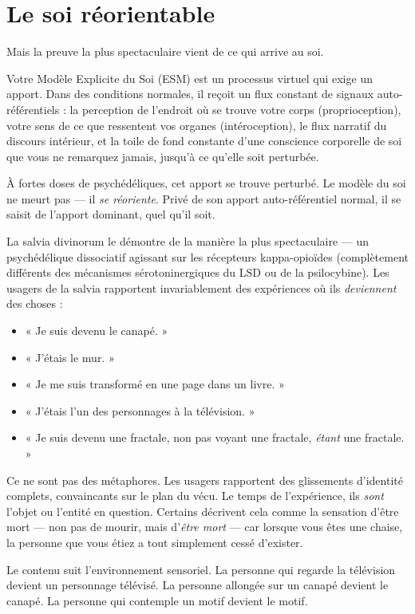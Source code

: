 \documentclass[11pt, twoside, openright]{book}
\begin{document}
\section*{Le soi réorientable}

Mais la preuve la plus spectaculaire vient de ce qui arrive au soi.

Votre Modèle Explicite du Soi (ESM) est un processus virtuel qui exige un apport. Dans des conditions normales, il reçoit un flux constant de signaux auto-référentiels : la perception de l'endroit où se trouve votre corps (proprioception), votre sens de ce que ressentent vos organes (intéroception), le flux narratif du discours intérieur, et la toile de fond constante d'une conscience corporelle de soi que vous ne remarquez jamais, jusqu'à ce qu'elle soit perturbée.

À fortes doses de psychédéliques, cet apport se trouve perturbé. Le modèle du soi ne meurt pas --- il \textit{se réoriente}. Privé de son apport auto-référentiel normal, il se saisit de l'apport dominant, quel qu'il soit.

La salvia divinorum le démontre de la manière la plus spectaculaire --- un psychédélique dissociatif agissant sur les récepteurs kappa-opioïdes (complètement différents des mécanismes sérotoninergiques du LSD ou de la psilocybine). Les usagers de la salvia rapportent invariablement des expériences où ils \textit{deviennent} des choses :

\begin{itemize}
  \item « Je suis devenu le canapé. »
  \item « J'étais le mur. »
  \item « Je me suis transformé en une page dans un livre. »
  \item « J'étais l'un des personnages à la télévision. »
  \item « Je suis devenu une fractale, non pas voyant une fractale, \textit{étant} une fractale. »
\end{itemize}

Ce ne sont pas des métaphores. Les usagers rapportent des glissements d'identité complets, convaincants sur le plan du vécu. Le temps de l'expérience, ils \textit{sont} l'objet ou l'entité en question. Certains décrivent cela comme la sensation d'être mort --- non pas de mourir, mais d'\textit{être mort} --- car lorsque vous êtes une chaise, la personne que vous étiez a tout simplement cessé d'exister.

Le contenu suit l'environnement sensoriel. La personne qui regarde la télévision devient un personnage télévisé. La personne allongée sur un canapé devient le canapé. La personne qui contemple un motif devient le motif.
\end{document}
